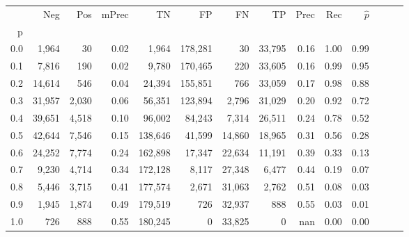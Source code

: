 \begin{tabular}{rrrrrrrrrrrrrr}
\toprule
{} &     Neg &    Pos & mPrec &       TN &       FP &      FN &      TP &  Prec &   Rec & $\hat{p}$ \\
p   &         &        &       &          &          &         &         &       &       &           \\
\midrule
0.0 &   1,964 &     30 &  0.02 &    1,964 &  178,281 &      30 &  33,795 &  0.16 &  1.00 &      0.99 \\
0.1 &   7,816 &    190 &  0.02 &    9,780 &  170,465 &     220 &  33,605 &  0.16 &  0.99 &      0.95 \\
0.2 &  14,614 &    546 &  0.04 &   24,394 &  155,851 &     766 &  33,059 &  0.17 &  0.98 &      0.88 \\
0.3 &  31,957 &  2,030 &  0.06 &   56,351 &  123,894 &   2,796 &  31,029 &  0.20 &  0.92 &      0.72 \\
0.4 &  39,651 &  4,518 &  0.10 &   96,002 &   84,243 &   7,314 &  26,511 &  0.24 &  0.78 &      0.52 \\
0.5 &  42,644 &  7,546 &  0.15 &  138,646 &   41,599 &  14,860 &  18,965 &  0.31 &  0.56 &      0.28 \\
0.6 &  24,252 &  7,774 &  0.24 &  162,898 &   17,347 &  22,634 &  11,191 &  0.39 &  0.33 &      0.13 \\
0.7 &   9,230 &  4,714 &  0.34 &  172,128 &    8,117 &  27,348 &   6,477 &  0.44 &  0.19 &      0.07 \\
0.8 &   5,446 &  3,715 &  0.41 &  177,574 &    2,671 &  31,063 &   2,762 &  0.51 &  0.08 &      0.03 \\
0.9 &   1,945 &  1,874 &  0.49 &  179,519 &      726 &  32,937 &     888 &  0.55 &  0.03 &      0.01 \\
1.0 &     726 &    888 &  0.55 &  180,245 &        0 &  33,825 &       0 &   nan &  0.00 &      0.00 \\
\bottomrule
\end{tabular}
